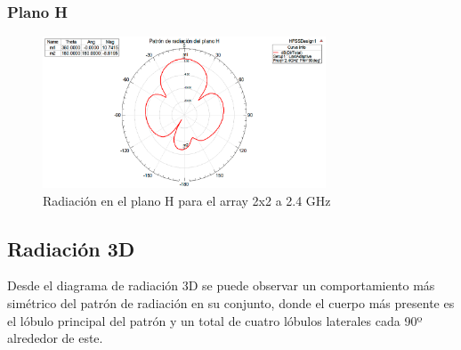 \subsubsection{Plano H}
\begin{figure}[H]
    \centering
        \includegraphics[width=0.75\textwidth]{archivos/analisis/2x21/5}
        \caption{Radiación en el plano H para el array 2x2 a 2.4 GHz}
        \label{fig:H2x21}
\end{figure}

\subsection{Radiación 3D}
\label{rad3d2x21}
\par Desde el diagrama de radiación 3D se puede observar un comportamiento más simétrico del patrón de radiación en su conjunto, donde el cuerpo más presente es el lóbulo principal del patrón y un total de cuatro lóbulos laterales cada 90º alrededor de este.

